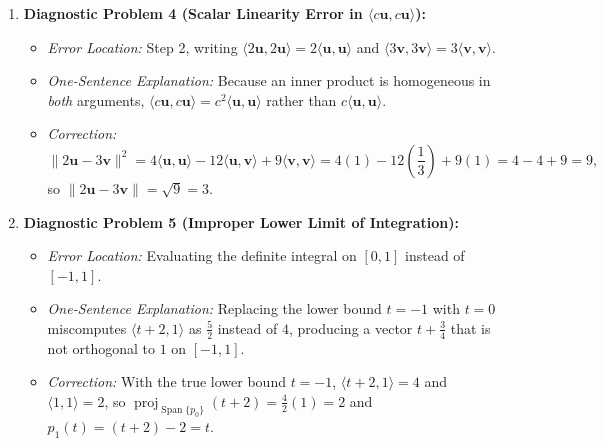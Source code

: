 \documentclass[11pt, letterpaper]{article}
\theoremstyle{definition}
\theoremstyle{remark}
\begin{document}
\begin{enumerate}
    \item \textbf{Diagnostic Problem 4 (Scalar Linearity Error in $\langle c\mathbf{u}, c\mathbf{u} \rangle$):}
    \begin{itemize}
        \item \emph{Error Location:} Step 2, writing $\langle 2\mathbf{u}, 2\mathbf{u} \rangle = 2\langle \mathbf{u}, \mathbf{u} \rangle$ and $\langle 3\mathbf{v}, 3\mathbf{v} \rangle = 3\langle \mathbf{v}, \mathbf{v} \rangle$.
        \item \emph{One-Sentence Explanation:} Because an inner product is homogeneous in \emph{both} arguments, $\langle c\mathbf{u}, c\mathbf{u} \rangle = c^2 \langle \mathbf{u}, \mathbf{u} \rangle$ rather than $c\langle \mathbf{u}, \mathbf{u} \rangle$.
        \item \emph{Correction:}
        \[
            \|2\mathbf{u} - 3\mathbf{v}\|^2 = 4\langle \mathbf{u}, \mathbf{u} \rangle - 12\langle \mathbf{u}, \mathbf{v} \rangle + 9\langle \mathbf{v}, \mathbf{v} \rangle = 4(1) - 12\left(\frac{1}{3}\right) + 9(1) = 4 - 4 + 9 = 9,
        \]
        so $\|2\mathbf{u} - 3\mathbf{v}\| = \sqrt{9} = 3$.
    \end{itemize}

    \item \textbf{Diagnostic Problem 5 (Improper Lower Limit of Integration):}
    \begin{itemize}
        \item \emph{Error Location:} Evaluating the definite integral on $[0, 1]$ instead of $[-1, 1]$.
        \item \emph{One-Sentence Explanation:} Replacing the lower bound $t = -1$ with $t = 0$ miscomputes $\langle t+2, 1 \rangle$ as $\frac{5}{2}$ instead of $4$, producing a vector $t + \frac{3}{4}$ that is not orthogonal to $1$ on $[-1, 1]$.
        \item \emph{Correction:} With the true lower bound $t = -1$, $\langle t+2, 1 \rangle = 4$ and $\langle 1, 1 \rangle = 2$, so $\operatorname{proj}_{\operatorname{Span}\{p_0\}}(t+2) = \frac{4}{2}(1) = 2$ and $p_1(t) = (t+2) - 2 = t$.
    \end{itemize}
\end{enumerate}
\end{document}
